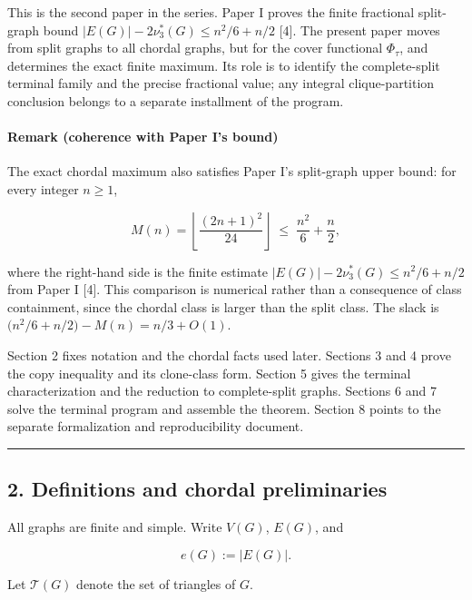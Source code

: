 \documentclass[english,11pt,a4paper]{article}
\begin{document}
This is the second paper in the series. Paper I proves the finite
fractional split-graph bound \(|E(G)|-2\nu_3^*(G)\le n^2/6+n/2\)
{[}4{]}. The present paper moves from split graphs to all chordal
graphs, but for the cover functional \(\Phi_\tau\), and determines the
exact finite maximum. Its role is to identify the complete-split
terminal family and the precise fractional value; any integral
clique-partition conclusion belongs to a separate installment of the
program.

\paragraph{Remark (coherence with Paper I's
bound)}\label{remark-coherence-with-paper-is-bound}

The exact chordal maximum also satisfies Paper I's split-graph upper
bound: for every integer \(n\ge1\),

\[
M(n)=\left\lfloor\frac{(2n+1)^2}{24}\right\rfloor
\;\le\;
\frac{n^2}{6}+\frac{n}{2},
\]

where the right-hand side is the finite estimate
\(|E(G)|-2\nu_3^*(G)\le n^2/6+n/2\) from Paper I {[}4{]}. This
comparison is numerical rather than a consequence of class containment,
since the chordal class is larger than the split class. The slack is
\(\bigl(n^2/6+n/2\bigr)-M(n)=n/3+O(1)\).

Section 2 fixes notation and the chordal facts used later. Sections 3
and 4 prove the copy inequality and its clone-class form. Section 5
gives the terminal characterization and the reduction to complete-split
graphs. Sections 6 and 7 solve the terminal program and assemble the
theorem. Section 8 points to the separate formalization and
reproducibility document.

\begin{center}\rule{0.5\linewidth}{0.5pt}\end{center}

\subsection{2. Definitions and chordal
preliminaries}\label{definitions-and-chordal-preliminaries}

All graphs are finite and simple. Write \(V(G)\), \(E(G)\), and

\[
e(G):=|E(G)|.
\]

Let \(\mathcal T(G)\) denote the set of triangles of \(G\).
\end{document}
